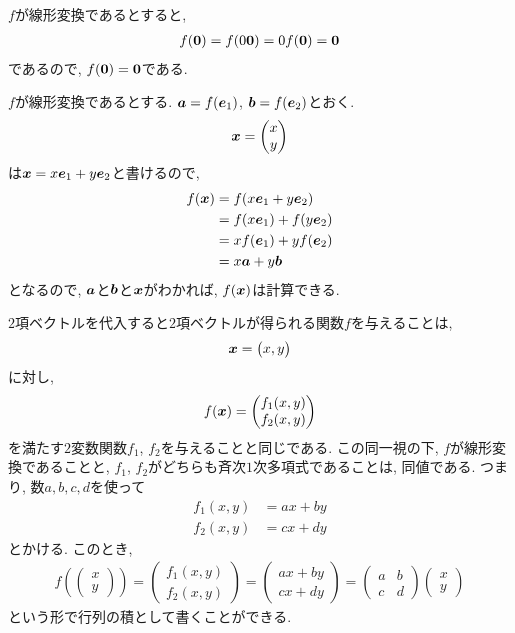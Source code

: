 \begin{remark}
  \label{thm:linmap:zero}
  $f$が線形変換であるとすると,
  \begin{align*}
    f(\boldsymbol{0})=f(0\boldsymbol{0})=0f(\boldsymbol{0})=\boldsymbol{0}
  \end{align*}
   であるので,   $f(\boldsymbol{0})=\boldsymbol{0}$である.
\end{remark}
\begin{remark}
  $f$が線形変換であるとする.
  $\boldsymbol{a}=f(\boldsymbol{e}_1)$,
  $\boldsymbol{b}=f(\boldsymbol{e}_2)$とおく.
  \begin{align*}
    \boldsymbol{x}=\begin{pmatrix}x\\y\end{pmatrix}
  \end{align*}
  は$\boldsymbol{x}=x\boldsymbol{e}_1+y\boldsymbol{e}_2$と書けるので,
  \begin{align*}
    f(\boldsymbol{x})
    &=f(x\boldsymbol{e}_1+y\boldsymbol{e}_2)\\
    &=f(x\boldsymbol{e}_1)+f(y\boldsymbol{e}_2)\\
    &=xf(\boldsymbol{e}_1)+yf(\boldsymbol{e}_2)\\
    &=x\boldsymbol{a}+y\boldsymbol{b}
  \end{align*}
  となるので, $\boldsymbol{a}$と$\boldsymbol{b}$と$\boldsymbol{x}$がわかれば,
  $f(\boldsymbol{x})$は計算できる.
\end{remark}


$2$項ベクトルを代入すると$2$項ベクトルが得られる関数$f$を与えることは,
  \begin{align*}
    \boldsymbol{x}=\begin{pmatrix}x,y\end{pmatrix}
  \end{align*}
  に対し,
  \begin{align*}
    f(\boldsymbol{x})=
    \begin{pmatrix}
      f_1(x,y)\\
      f_2(x,y)
    \end{pmatrix}
  \end{align*}
  を満たす$2$変数関数$f_1$, $f_2$を与えることと同じである.
  この同一視の下,
  $f$が線形変換であることと, $f_1$, $f_2$がどちらも斉次$1$次多項式であることは,
  同値である.
  つまり, 数$a,b,c,d$を使って 
  \begin{align*}
    f_1(x,y)&=ax+by\\
    f_2(x,y)&=cx+dy
  \end{align*}
  とかける.  このとき,
  \begin{align*}
    f(\begin{pmatrix}x\\y\end{pmatrix})
      =
      \begin{pmatrix}f_1(x,y)\\f_2(x,y)\end{pmatrix}
      =\begin{pmatrix}ax+by\\cx+dy\end{pmatrix}
    =\begin{pmatrix}a&b\\c&d\end{pmatrix}\begin{pmatrix}x\\y\end{pmatrix}
  \end{align*}
  という形で行列の積として書くことができる.

